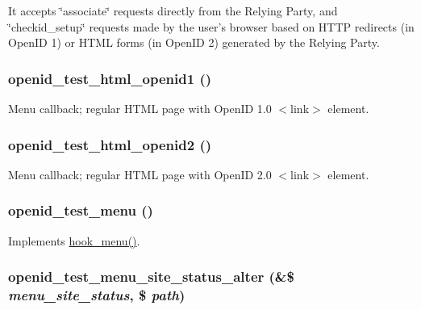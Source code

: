 It accepts \char`\"{}associate\char`\"{} requests directly from the Relying Party, and \char`\"{}checkid\_\-setup\char`\"{} requests made by the user's browser based on HTTP redirects (in OpenID 1) or HTML forms (in OpenID 2) generated by the Relying Party. \hypertarget{openid__test_8module_ad596225f599d5e3b6f8f8e336ea2db57}{
\subsubsection[{openid\_\-test\_\-html\_\-openid1}]{\setlength{\rightskip}{0pt plus 5cm}openid\_\-test\_\-html\_\-openid1 ()}}
\label{openid__test_8module_ad596225f599d5e3b6f8f8e336ea2db57}
Menu callback; regular HTML page with OpenID 1.0 $<$link$>$ element. \hypertarget{openid__test_8module_aac0cf89f06ec26002f00a1966af2a82b}{
\subsubsection[{openid\_\-test\_\-html\_\-openid2}]{\setlength{\rightskip}{0pt plus 5cm}openid\_\-test\_\-html\_\-openid2 ()}}
\label{openid__test_8module_aac0cf89f06ec26002f00a1966af2a82b}
Menu callback; regular HTML page with OpenID 2.0 $<$link$>$ element. \hypertarget{openid__test_8module_a601b7466dc5349b7eb9687a630ee74cf}{
\subsubsection[{openid\_\-test\_\-menu}]{\setlength{\rightskip}{0pt plus 5cm}openid\_\-test\_\-menu ()}}
\label{openid__test_8module_a601b7466dc5349b7eb9687a630ee74cf}
Implements \hyperlink{group__hooks_ga5c95244fea59b25666e409759e133ded}{hook\_\-menu()}. \hypertarget{openid__test_8module_ada79e0478bbc38e21a7bb7981e9797ee}{
\subsubsection[{openid\_\-test\_\-menu\_\-site\_\-status\_\-alter}]{\setlength{\rightskip}{0pt plus 5cm}openid\_\-test\_\-menu\_\-site\_\-status\_\-alter (\&\$ {\em menu\_\-site\_\-status}, \/  \$ {\em path})}}
